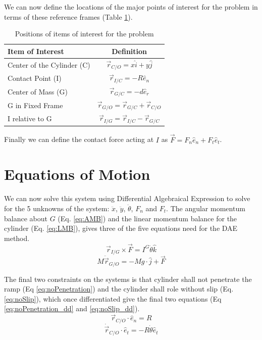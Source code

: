 \documentclass[12pt]{article}
\let\Oldsection\section
\renewcommand{\section}{\FloatBarrier\Oldsection}
\begin{document}
We can now define the locations of the major points of interest for the problem in terms of these reference frames (Table \ref{tab:LocationDefs}).
\begin{table}[h]
\centering
\begin{tabular}{lc}
Item of Interest			& Definition \\\hline
Center of the Cylinder (C)	& $\vec{r}_{C/O} = x\hat{i} + y \hat{j}$\\
Contact Point (I)			& $\vec{r}_{I/C} = -R \hat{e}_n$\\
Center of Mass (G)			& $\vec{r}_{G/C} = -d \hat{e}_r$\\
G in Fixed Frame			& $\vec{r}_{G/O} = \vec{r}_{G/C} + \vec{r}_{C/O}$ \\
I relative to G				& $\vec{r}_{I/G} = \vec{r}_{I/C} - \vec{r}_{G/C}$ \\
\end{tabular}
\caption{Positions of items of interest for the problem}
\label{tab:LocationDefs}
\end{table}

Finally we can define the contact force acting at $I$ as $\vec{F} = F_n \hat{e}_n + F_t \hat{e}_t$.

\section{Equations of Motion}
We can now solve this system using Differential Algebraical Expression to solve for the 5 unknowns of the system: $\ddot{x}$, $\ddot{y}$, $\ddot{\theta}$, $F_n$ and $F_t$.
The angular momentum balance about $G$ (Eq. \ref{eq:AMB}) and the linear momentum balance for the cylinder (Eq. \ref{eq:LMB}), gives three of the five equations need for the DAE method.
\begin{equation}\label{eq:AMB}
\vec{r}_{I/G} \times \vec{F} = I^G\ddot{\theta} \hat{k}
\end{equation}
\begin{equation}\label{eq:LMB}
M \ddot{\vec{r}}_{G/O} = -Mg \cdot\hat{j} + \vec{F}
\end{equation}

The final two constraints on the systems is that cylinder shall not penetrate the ramp (Eq \ref{eq:noPenetration}) and the cylinder shall role without slip (Eq. \ref{eq:noSlip}), which once differentiated give the final two equations (Eq \ref{eq:noPenetration_dd} and \ref{eq:noSlip_dd}). 
\begin{equation}\label{eq:noPenetration}
\vec{r}_{C/O} \cdot \hat{e}_n = R
\end{equation}
\begin{equation}\label{eq:noSlip}
\dot{\vec{r}}_{C/O} \cdot \hat{e}_t = -R\dot{\theta}\hat{e}_t
\end{equation}
\end{document}
